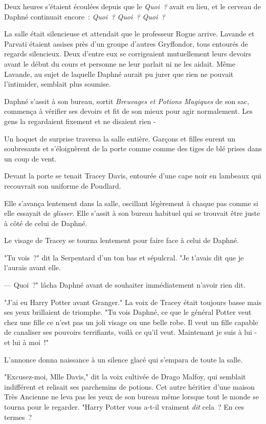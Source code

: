 Deux heures s'étaient écoulées depuis que le \emph{Quoi~?} avait eu lieu, et le cerveau de Daphné continuait encore~: \emph{Quoi~? Quoi~? Quoi~?}

La salle était silencieuse et attendait que le professeur Rogue arrive. Lavande et Parvati étaient assises près d'un groupe d'autres Gryffondor, tous entourés de regards silencieux. Deux d'entre eux se corrigeaient mutuellement leurs devoirs avant le début du cours et personne ne leur parlait ni ne les aidait. Même Lavande, au sujet de laquelle Daphné aurait pu jurer que rien ne pouvait l'intimider, semblait plus soumise.

Daphné s'assit à son bureau, sortit \emph{Breuvages et Potions Magiques} de son sac, commença à vérifier ses devoirs et fit de son mieux pour agir normalement. Les gens la regardaient fixement et ne disaient rien -

Un hoquet de surprise traversa la salle entière. Garçons et filles eurent un soubresauts et s'éloignèrent de la porte comme comme des tiges de blé prises dans un coup de vent.

Devant la porte se tenait Tracey Davis, entourée d'une cape noir en lambeaux qui recouvrait son uniforme de Poudlard.

Elle s'avança lentement dans la salle, oscillant légèrement à chaque pas comme si elle essayait de \emph{glisser}. Elle s'assit à son bureau habituel qui se trouvait être juste à côté de celui de Daphné.

Le visage de Tracey se tourna lentement pour faire face à celui de Daphné.

"Tu vois~?" dit la Serpentard d'un ton bas et sépulcral. "Je t'avais dit que je l'aurais avant elle.

--- Quoi~?" lâcha Daphné avant de souhaiter immédiatement n'avoir rien dit.

"J'ai eu Harry Potter avant Granger." La voix de Tracey était toujours basse mais ses yeux brillaient de triomphe. "Tu vois Daphné, ce que le général Potter veut chez une fille ce n'est pas un joli visage ou une belle robe. Il veut un fille capable de canaliser ses pouvoirs terrifiants, voilà ce qu'il veut. Maintenant je suis à lui - et lui à moi~!"

L'annonce donna naissance à un silence glacé qui s'empara de toute la salle.

"Excusez-moi, Mlle Davis," dit la voix cultivée de Drago Malfoy, qui semblait indifférent et relisait ses parchemins de potions. Cet autre héritier d'une maison Très Ancienne ne leva pas les yeux de son bureau même lorsque tout le monde se tourna pour le regarder. "Harry Potter vous a-t-il vraiment \emph{dit} cela~? En ces termes~?

